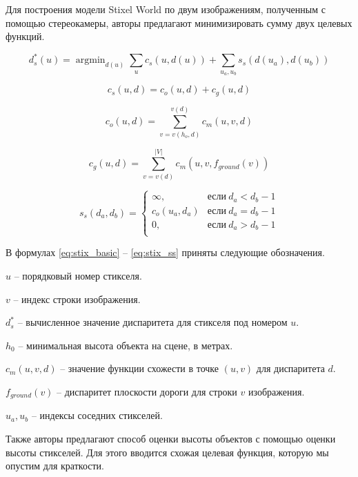\documentclass[aps,%
14pt,%
final,%
oneside,
onecolumn,%
musixtex, %
superscriptaddress,%
centertags]{extarticle} %
\DeclareMathOperator*{\argmin}{argmin}
\begin{document}
Для построения модели Stixel World по двум изображениям, полученным с помощью стереокамеры, авторы предлагают минимизировать сумму двух целевых функций.

\begin{equation}\label{eq:stix_basic}
d^*_s(u) = \argmin_{d(u)}\sum_u c_s(u, d(u)) + \sum_{u_a, u_b} s_s(d(u_a), d(u_b))
\end{equation}

\begin{equation}
c_s(u, d) = c_o(u, d) + c_g(u, d)
\end{equation}

\begin{equation}
c_o(u, d) = \sum_{v=v(h_o, d)}^{v(d)} c_m(u, v, d)
\end{equation}

\begin{equation}
c_g(u, d) = \sum_{v=v(d)}^{|V|} c_m(u, v, f_{ground}(v))
\end{equation}

\begin{equation}\label{eq:stix_ss}
s_s(d_a, d_b)=
\begin{cases}
  \infty, & \text{если}\ d_a < d_b - 1 \\
  c_o(u_a, d_a) & \text{если}\ d_a = d_b - 1 \\
  0, & \text{если}\ d_a > d_b - 1 \\
\end{cases}
\end{equation}

В формулах \ref{eq:stix_basic} -- \ref{eq:stix_ss} приняты следующие обозначения.

$u$ -- порядковый номер стикселя.

$v$ -- индекс строки изображения.

$d^*_s$ -- вычисленное значение диспаритета для стикселя под номером $u$.

$h_0$ -- минимальная высота объекта на сцене, в метрах.

$c_m(u, v, d)$ -- значение функции схожести в точке $(u, v)$ для диспаритета $d$.

$f_{ground}(v)$ -- диспаритет плоскости дороги для строки $v$ изображения.

$u_a, u_b$ -- индексы соседних стикселей.

Также авторы предлагают способ оценки высоты объектов с помощью оценки высоты стикселей. Для этого вводится схожая целевая функция, которую мы опустим для краткости.
\end{document}
